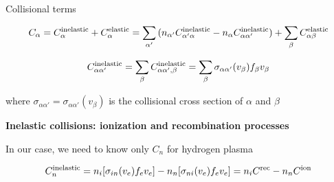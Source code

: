 \documentclass{beamer}
\begin{document}
\begin{frame}{Collisional terms }

\begin{equation} \nonumber
C_{\alpha} = C_\alpha^{\rm inelastic}  + C_\alpha^{\rm elastic} = \sum_{\alpha'} {(n_{\alpha'} C_{\alpha'\alpha}^{\rm inelastic} - n_{\alpha} C_{\alpha\alpha'}^{\rm inelastic}}) + \sum_{\beta} C_{\alpha \beta}^{\rm elastic}
\end{equation}

\begin{equation}  \nonumber
C_{\alpha\alpha'}^{\rm inelastic} =  \sum_{\beta} {C_{\alpha\alpha',\beta}^{\rm inelastic} } = \sum_{\beta} \sigma_{\alpha \alpha'} (v_{\beta})f_{\beta} v_{\beta}
\end{equation}

where $\sigma_{\alpha \alpha'} = \sigma_{\alpha \alpha'}(v_{\beta}) $  is the collisional cross section of $\alpha$ and $\beta$ 
\vspace{0.5cm}

{\bf Inelastic collisions: ionization and recombination processes} 
\vspace{0.5cm}


In our case, we need to know only $C_n$ for hydrogen plasma

\begin{equation}  \nonumber
C_n^{\rm inelastic} = n_i  [\sigma_{in} (v_e) f_e v_e ]- n_n [\sigma_{ni} (v_e)  f_e v_e] = n_i C^{\rm rec} - n_n C^{\rm ion}
\end{equation}

\end{frame}
\end{document}
